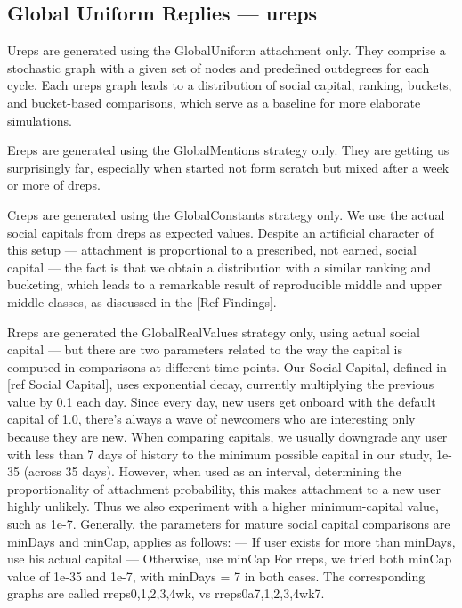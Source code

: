 \documentclass[10pt,oneside]{memoir}
\begin{document}
\subsection{Global Uniform Replies --- ureps}
\label{globaluniformrepliesureps}

Ureps are generated using the GlobalUniform attachment only.  They comprise a stochastic graph with a given set of nodes and predefined outdegrees for each cycle.  Each ureps graph leads to a distribution of social capital, ranking, buckets, and bucket-based comparisons, which serve as a baseline for more elaborate simulations.


Ereps are generated using the GlobalMentions strategy only.  They are getting us surprisingly far, especially when started not form scratch but mixed after a week or more of dreps.


Creps are generated using the GlobalConstants strategy only.  We use the actual social capitals from dreps as expected values.  Despite an artificial character of this setup --- attachment is proportional to a prescribed, not earned, social capital --- the fact is that we obtain a distribution with a similar ranking and bucketing, which leads to a remarkable result of reproducible middle and upper middle classes, as discussed in the [Ref Findings].


Rreps are generated the GlobalRealValues strategy only, using actual social capital --- but there are two parameters related to the way the capital is computed in comparisons at different time points.  Our Social Capital, defined in [ref Social Capital], uses exponential decay, currently multiplying the previous value by 0.1 each day.  Since every day, new users get onboard with the default capital of 1.0, there's always a wave of newcomers who are interesting only because they are new.  When comparing capitals, we usually downgrade any user with less than 7 days of history to the minimum possible capital in our study, 1e-35 (across 35 days).  However, when used as an interval, determining the proportionality of attachment probability, this makes attachment to a new user highly unlikely.  Thus we also experiment with a higher minimum-capital value, such as 1e-7.  Generally, the parameters for mature social capital comparisons are minDays and minCap, applies as follows:
--- If user exists for more than minDays, use his actual capital
--- Otherwise, use minCap
For rreps, we tried both minCap value of 1e-35 and 1e-7, with minDays = 7 in both cases.  The corresponding graphs are called rreps{0,{1,2,3,4}wk}, vs rreps{0a7,{1,2,3,4}wk7}.
\end{document}
